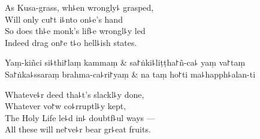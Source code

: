 \begin{english}
  As Kusa-grass, wh꜕en wrongly꜕ grasped,\\
  Will only cu꜓t i꜕nto on꜕e's hand\\
  So does th꜕e monk's lif꜕e wrongl꜕y led\\
  Indeed drag on꜓e t꜕o hell꜕ish states.
\end{english}

\begin{twochants}
  Yaṃ-kiñci si꜕thi꜓laṃ kammaṃ & sa꜓ṅki꜕liṭṭha꜓ñ-ca꜕ yaṃ va꜓taṃ \\
  Sa꜓ṅka꜕ssaraṃ brahma-ca꜕ri꜓yaṃ & na taṃ ho꜓ti ma꜕happh꜕alan-ti \\
\end{twochants}

\begin{english}
  Whateve꜕r deed tha꜕t's slackl꜕y done,\\
  Whatever vo꜓w co꜕rruptl꜕y kept,\\
  The Holy Life le꜕d in꜕ doubtf꜕ul ways ---\\
  All these will ne꜓ve꜕r bear gr꜕eat fruits.
\end{english}


